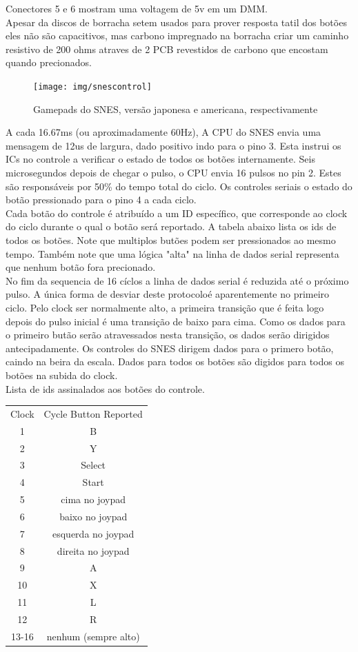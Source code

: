 \documentclass[paper=a4, fontsize=11pt]{scrartcl}	%
\numberwithin{equation}{section}															%
\numberwithin{figure}{section}																%
\numberwithin{table}{section}																%
\begin{document}
Conectores 5 e 6 mostram uma voltagem de 5v em um DMM.\\
Apesar da discos de borracha setem usados para prover resposta tatil dos botões eles não são capacitivos, mas carbono impregnado na borracha criar um caminho resistivo de 200 ohms atraves de 2 PCB revestidos de carbono que encostam quando precionados.\\
\begin{figure}[h!]
	\centering
    \texttt{[image: img/snescontrol]}
    \caption{Gamepads do SNES, versão japonesa e americana, respectivamente}
\end{figure}
A cada 16.67ms (ou aproximadamente 60Hz), A CPU do SNES envia uma mensagem de 12us de largura, dado positivo indo para o pino 3. Esta instrui os ICs no controle a verificar o estado de todos os botões internamente. Seis microsegundos depois de chegar o pulso, o CPU envia 16 pulsos no pin 2. Estes são responsáveis por 50\% do tempo total do ciclo. Os controles seriais o estado do botão pressionado para o pino 4 a cada ciclo.\\
Cada botão do controle é atribuído a um ID específico, que corresponde ao clock do ciclo durante o qual o botão será reportado. A tabela abaixo lista os ids de todos os botões. Note que multiplos butões podem ser pressionados ao mesmo tempo. Também note que uma lógica "alta" na linha de dados serial representa que nenhum botão fora precionado.\\
No fim da sequencia de 16 cíclos a linha de dados serial é reduzida até o próximo pulso. A única forma de desviar deste protocoloé aparentemente no primeiro ciclo. Pelo clock ser normalmente alto, a primeira transição que é feita logo depois do pulso inicial é uma transição de baixo para cima. Como os dados para o primeiro butão serão atravessados nesta transição, os dados serão dirigidos antecipadamente. Os controles do SNES dirigem dados para o primero botão, caindo na beira da escala. Dados para todos os botões são digidos para todos os botões na subida do clock.\\
Lista de ids assinalados aos botões do controle.\\
\begin{tabular}{cc}
\label{tab:but}	
Clock & Cycle	Button Reported \\
1 &	B\\
2 &	Y\\
3 &	Select\\
4 &	Start\\
5 &	cima no joypad\\
6 &	baixo no joypad\\
7 &	esquerda no joypad\\
8 &	direita no joypad\\
9 &	A\\
10 &	X\\
11 &	L\\
12 &	R\\
13-16 &	nenhum (sempre alto)\\
\end{tabular}
\end{document}
